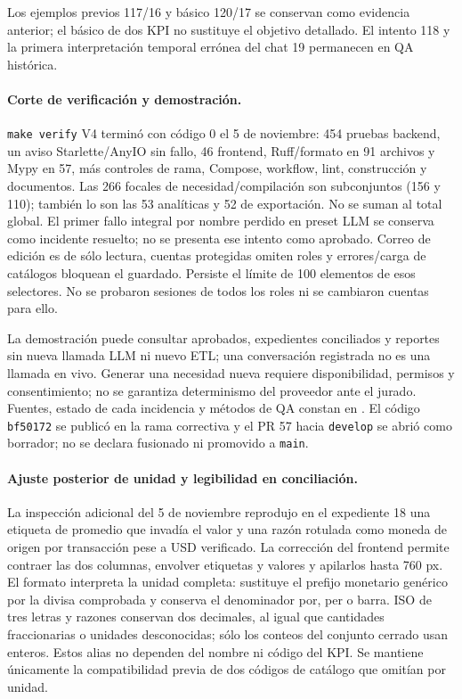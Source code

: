 \documentclass[11pt,letterpaper]{article}
\newcommand{\file}[1]{\texttt{#1}}
\begin{document}
Los ejemplos previos 117/16 y básico 120/17 se conservan como evidencia anterior;
el básico de dos KPI no sustituye el objetivo detallado. El intento 118 y la
primera interpretación temporal errónea del chat 19 permanecen en QA histórica.

\paragraph{Corte de verificación y demostración.}
\file{make verify} V4 terminó con código 0 el 5 de noviembre: 454 pruebas backend,
un aviso Starlette/AnyIO sin fallo, 46 frontend, Ruff/formato en 91 archivos y
Mypy en 57, más controles de rama, Compose, workflow, lint, construcción y documentos.
Las 266 focales de necesidad/compilación son subconjuntos (156 y 110); también lo
son las 53 analíticas y 52 de exportación. No se suman al total global.
El primer fallo integral por nombre perdido en preset LLM se conserva como incidente
resuelto; no se presenta ese intento como aprobado. Correo de edición es de sólo
lectura, cuentas protegidas omiten roles y errores/carga de catálogos bloquean
el guardado. Persiste el límite de 100 elementos de esos selectores. No se probaron
sesiones de todos los roles ni se cambiaron cuentas para ello.

La demostración puede consultar aprobados, expedientes conciliados y reportes sin
nueva llamada LLM ni nuevo ETL; una conversación registrada no es una llamada en vivo.
Generar una necesidad nueva requiere disponibilidad, permisos y consentimiento;
no se garantiza determinismo del proveedor ante el jurado. Fuentes, estado de cada
incidencia y métodos de QA constan en
. El código \file{bf50172} se publicó
en la rama correctiva y el PR 57 hacia \file{develop} se abrió como borrador;
no se declara fusionado ni promovido a \file{main}.

\paragraph{Ajuste posterior de unidad y legibilidad en conciliación.}
La inspección adicional del 5 de noviembre reprodujo en el expediente 18 una
etiqueta de promedio que invadía el valor y una razón rotulada como moneda de
origen por transacción pese a USD verificado. La corrección del frontend permite
contraer las dos columnas, envolver etiquetas y valores y apilarlos hasta 760 px.
El formato interpreta la unidad completa: sustituye el prefijo monetario genérico
por la divisa comprobada y conserva el denominador por, per o barra. ISO de tres
letras y razones conservan dos decimales, al igual que cantidades fraccionarias o
unidades desconocidas; sólo los conteos del conjunto cerrado usan enteros.
Estos alias no dependen del nombre ni código del KPI. Se mantiene únicamente la
compatibilidad previa de dos códigos de catálogo que omitían por unidad.
\end{document}
